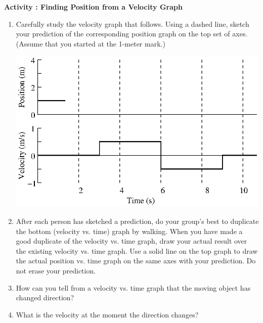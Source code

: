 \newpage

\textbf{Activity : Finding Position from a Velocity Graph }

\begin{enumerate}

\item Carefully study the velocity graph that follows. Using a dashed line, sketch your prediction of the corresponding position graph on the top set of axes.
(Assume that you started at the 1-meter mark.)

\vspace{0.3cm}
{\par\centering \includegraphics{iqsRelatingMotion/relating_fig2.eps} \par}
\vspace{0.3cm}

\item After each person has sketched a prediction, do your group's best to duplicate the bottom (velocity vs. time) graph by walking. 
When you have made a good duplicate of the velocity vs. time graph, draw your actual result over the existing velocity vs. time graph. 
Use a solid line on the top graph to draw the actual position vs. time graph on the same axes with your prediction. Do not erase your prediction.

\item How can you tell from a velocity vs. time graph that the moving object has
changed direction?
\vspace{10mm}

\item What is the velocity at the moment the direction changes? 
\vspace{10mm}


\end{enumerate}
